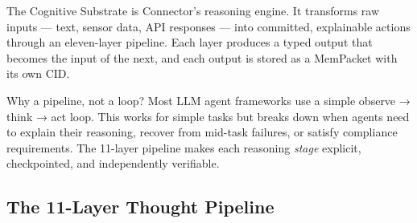 The Cognitive Substrate is Connector's reasoning engine. It transforms raw
inputs — text, sensor data, API responses — into committed, explainable actions
through an eleven-layer pipeline. Each layer produces a typed output that
becomes the input of the next, and each output is stored as a MemPacket with
its own CID.

\begin{insightbox}{Why a pipeline, not a loop?}
Most LLM agent frameworks use a simple observe → think → act loop. This works
for simple tasks but breaks down when agents need to explain their reasoning,
recover from mid-task failures, or satisfy compliance requirements. The 11-layer
pipeline makes each reasoning \emph{stage} explicit, checkpointed, and
independently verifiable.
\end{insightbox}

\subsection{The 11-Layer Thought Pipeline}

